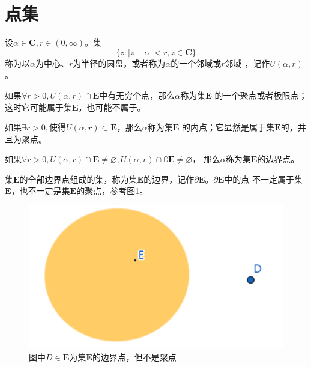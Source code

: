 \documentclass[lang=cn,10pt]{elegantbook}
\begin{document}
\section{点集}
\begin{definition}[邻域]
	设$\alpha \in \mathbf{C},r \in (0,\infty)$。集
	\begin{equation}
		\{z:\mid z-\alpha\mid<r,z\in\mathbf{C}\}
	\end{equation}
	称为以$\alpha$为中心、$r$为半径的圆盘，$\text{或者称为}$$\alpha\text{的一个邻域或}r$邻域
		，记作$U(\alpha,r)$。
\end{definition}

\begin{definition}[聚点]
	如果$\forall r >0,U(\alpha,r) \cap \mathbf{E}$中有无穷个点，那么$\alpha$称为集$\mathbf{E}$
	的一个聚点或者极限点；这时它可能属于集$\mathbf{E}$，也可能不属于。
\end{definition}

\begin{definition}[内点]
	如果$\exists r >0,$使得$U(\alpha,r) \subset \mathbf{E}$，那么$\alpha$称为集$\mathbf{E}$
	的内点；它显然是属于集$\mathbf{E}$的，并且为聚点。
\end{definition}

\begin{definition}[边界点]
	如果$\forall r >0,U(\alpha,r)\cap \mathbf{E}\neq\varnothing,U(\alpha,r)\cap\complement \mathbf{E}\neq\varnothing $，
	那么$\alpha$称为集$\mathbf{E}$的边界点。
\end{definition}

\begin{definition}[边界]
	集$\mathbf{E}$的全部边界点组成的集，称为集$\mathbf{E}$的边界，记作$\partial\mathbf{E}$。$\partial\mathbf{E}$中的点
	不一定属于集$\mathbf{E}$，也不一定是集$\mathbf{E}$的聚点，参考图\ref{imA_1}。
\end{definition}

\begin{figure}[h]
	\centering
	\includegraphics[scale = 0.6]{image/A_1.png}
	\caption{图中$D \in \mathbf{E}$为集$\mathbf{E}$的边界点，但不是聚点}
	\label{imA_1}
\end{figure}
\end{document}
